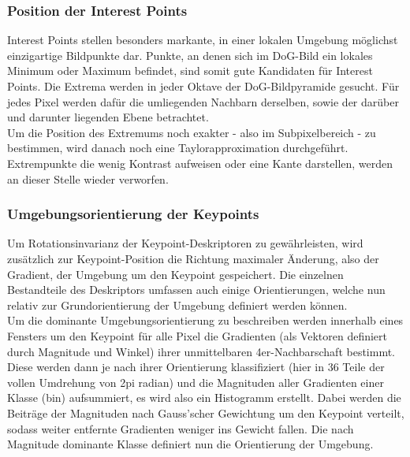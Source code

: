 \documentclass[deutsch]{scrartcl}
\begin{document}
\subsubsection{Position der Interest Points}
Interest Points stellen besonders markante, in einer lokalen Umgebung möglichst einzigartige Bildpunkte dar. Punkte, an denen sich im DoG-Bild ein lokales Minimum oder Maximum befindet, sind somit gute Kandidaten für Interest Points. Die Extrema werden in jeder Oktave der DoG-Bildpyramide gesucht. Für jedes Pixel werden dafür die umliegenden Nachbarn derselben, sowie der darüber und darunter liegenden Ebene betrachtet.\\
Um die Position des Extremums noch exakter - also im Subpixelbereich - zu bestimmen, wird danach noch eine Taylorapproximation durchgeführt.\\
Extrempunkte die wenig Kontrast aufweisen oder eine Kante darstellen, werden an dieser Stelle wieder verworfen. 



\subsubsection{Umgebungsorientierung der Keypoints}
Um Rotationsinvarianz der Keypoint-Deskriptoren zu gewährleisten, wird zusätzlich zur Keypoint-Position die Richtung maximaler Änderung, also der Gradient, der Umgebung um den Keypoint gespeichert. Die einzelnen Bestandteile des Deskriptors umfassen auch einige Orientierungen, welche nun relativ zur Grundorientierung der Umgebung definiert werden können.\\
Um die dominante Umgebungsorientierung zu beschreiben werden innerhalb eines Fensters um den Keypoint für alle Pixel die Gradienten (als Vektoren definiert durch Magnitude und Winkel) ihrer unmittelbaren 4er-Nachbarschaft bestimmt. Diese werden dann je nach ihrer Orientierung  klassifiziert (hier in 36 Teile der vollen Umdrehung von 2pi radian) und die Magnituden aller Gradienten einer Klasse (bin) aufsummiert, es wird also ein Histogramm erstellt. Dabei werden die Beiträge der Magnituden nach Gauss'scher Gewichtung um den Keypoint verteilt, sodass weiter entfernte Gradienten weniger ins Gewicht fallen. Die nach Magnitude dominante Klasse definiert nun die Orientierung der Umgebung.\cite{lowe04}
\end{document}
